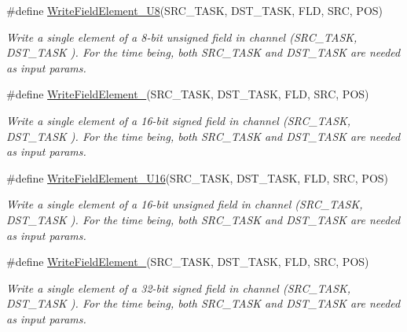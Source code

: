 \begin{DoxyCompactItemize}
\#define \hyperlink{group__interpow__read__write_gacaeeccfb46736afa8aa68d3ead9d49f3}{Write\+Field\+Element\+\_\+\+U8}(S\+R\+C\+\_\+\+T\+A\+SK,  D\+S\+T\+\_\+\+T\+A\+SK,  F\+LD,  S\+RC,  P\+OS)
\begin{DoxyCompactList}\small\item\em Write a single element of a 8-\/bit unsigned field in channel ({\itshape S\+R\+C\+\_\+\+T\+A\+SK}, {\itshape D\+S\+T\+\_\+\+T\+A\+SK} ). For the time being, both S\+R\+C\+\_\+\+T\+A\+SK and D\+S\+T\+\_\+\+T\+A\+SK are needed as input params. \end{DoxyCompactList}\item 
\#define \hyperlink{group__interpow__read__write_ga2b60b2e1baee24139a874dcd961f8aad}{Write\+Field\+Element\+\_}(S\+R\+C\+\_\+\+T\+A\+SK,  D\+S\+T\+\_\+\+T\+A\+SK,  F\+LD,  S\+RC,  P\+OS)
\begin{DoxyCompactList}\small\item\em Write a single element of a 16-\/bit signed field in channel ({\itshape S\+R\+C\+\_\+\+T\+A\+SK}, {\itshape D\+S\+T\+\_\+\+T\+A\+SK} ). For the time being, both S\+R\+C\+\_\+\+T\+A\+SK and D\+S\+T\+\_\+\+T\+A\+SK are needed as input params. \end{DoxyCompactList}\item 
\#define \hyperlink{group__interpow__read__write_gaa4b03c0cc35ebc5645ce74c5ce045986}{Write\+Field\+Element\+\_\+\+U16}(S\+R\+C\+\_\+\+T\+A\+SK,  D\+S\+T\+\_\+\+T\+A\+SK,  F\+LD,  S\+RC,  P\+OS)
\begin{DoxyCompactList}\small\item\em Write a single element of a 16-\/bit unsigned field in channel ({\itshape S\+R\+C\+\_\+\+T\+A\+SK}, {\itshape D\+S\+T\+\_\+\+T\+A\+SK} ). For the time being, both S\+R\+C\+\_\+\+T\+A\+SK and D\+S\+T\+\_\+\+T\+A\+SK are needed as input params. \end{DoxyCompactList}\item 
\#define \hyperlink{group__interpow__read__write_ga597258a7c772747373103ca32b9cccff}{Write\+Field\+Element\+\_}(S\+R\+C\+\_\+\+T\+A\+SK,  D\+S\+T\+\_\+\+T\+A\+SK,  F\+LD,  S\+RC,  P\+OS)
\begin{DoxyCompactList}\small\item\em Write a single element of a 32-\/bit signed field in channel ({\itshape S\+R\+C\+\_\+\+T\+A\+SK}, {\itshape D\+S\+T\+\_\+\+T\+A\+SK} ). For the time being, both S\+R\+C\+\_\+\+T\+A\+SK and D\+S\+T\+\_\+\+T\+A\+SK are needed as input params. \end{DoxyCompactList}\item 

\end{DoxyCompactItemize}
